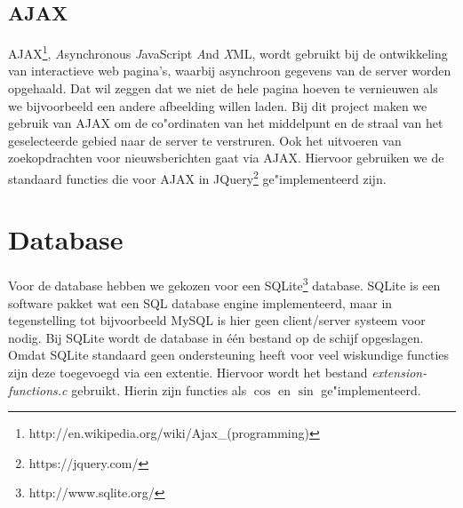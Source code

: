 \documentclass[twoside,openright]{uva-bachelor-thesis}
\begin{document}
		\subsection{AJAX}
			AJAX\footnote{http://en.wikipedia.org/wiki/Ajax\_(programming)}, \textit{A}synchronous \textit{J}avaScript \textit{A}nd \textit{X}ML, wordt gebruikt bij de ontwikkeling van interactieve web pagina's, waarbij asynchroon gegevens van de server worden opgehaald. Dat wil zeggen dat we niet de hele pagina hoeven te vernieuwen als we bijvoorbeeld een andere afbeelding willen laden. Bij dit project maken we gebruik van AJAX om de co"ordinaten van het middelpunt en de straal van het geselecteerde gebied naar de server te verstruren. Ook het uitvoeren van zoekopdrachten voor nieuwsberichten gaat via AJAX. Hiervoor gebruiken we de standaard functies die voor AJAX in JQuery\footnote{https://jquery.com/} ge"implementeerd zijn.
	\section{Database}
		Voor de database hebben we gekozen voor een SQLite\footnote{http://www.sqlite.org/} database. SQLite is een software pakket wat een SQL database engine implementeerd, maar in tegenstelling tot bijvoorbeeld MySQL is hier geen client/server systeem voor nodig. Bij SQLite wordt de database in \'e\'en bestand op de schijf opgeslagen.
		\\[0.5cm]
		Omdat SQLite standaard geen ondersteuning heeft voor veel wiskundige functies zijn deze toegevoegd via een extentie. Hiervoor wordt het bestand \textit{extension-functions.c} gebruikt. Hierin zijn functies als $\cos$ en $\sin$ ge"implementeerd.
\end{document}
